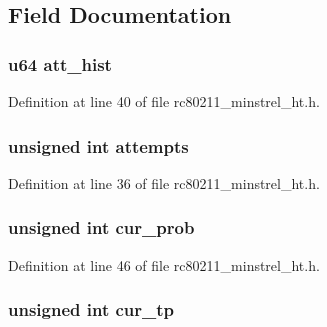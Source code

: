 \subsection{Field Documentation}
\hypertarget{structminstrel__rate__stats_ad1e0131b84d34b871828347daa221112}{
\subsubsection[{att\-\_\-hist}]{\setlength{\rightskip}{0pt plus 5cm}u64 att\-\_\-hist}}\label{structminstrel__rate__stats_ad1e0131b84d34b871828347daa221112}


Definition at line 40 of file rc80211\-\_\-minstrel\-\_\-ht.\-h.

\hypertarget{structminstrel__rate__stats_a8299d4347d9be4e1868c451df3551f7c}{
\subsubsection[{attempts}]{\setlength{\rightskip}{0pt plus 5cm}unsigned int attempts}}\label{structminstrel__rate__stats_a8299d4347d9be4e1868c451df3551f7c}


Definition at line 36 of file rc80211\-\_\-minstrel\-\_\-ht.\-h.

\hypertarget{structminstrel__rate__stats_a87a247add3a9e2f9416b9cb6f9a5bc98}{
\subsubsection[{cur\-\_\-prob}]{\setlength{\rightskip}{0pt plus 5cm}unsigned int cur\-\_\-prob}}\label{structminstrel__rate__stats_a87a247add3a9e2f9416b9cb6f9a5bc98}


Definition at line 46 of file rc80211\-\_\-minstrel\-\_\-ht.\-h.

\hypertarget{structminstrel__rate__stats_a4e2d3748d37ceaeb025df1d77052c809}{
\subsubsection[{cur\-\_\-tp}]{\setlength{\rightskip}{0pt plus 5cm}unsigned int cur\-\_\-tp}}\label{structminstrel__rate__stats_a4e2d3748d37ceaeb025df1d77052c809}


